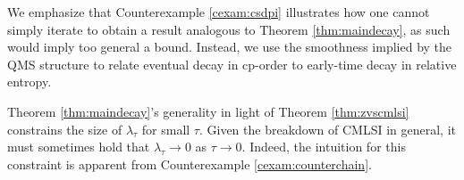 \documentclass[accepted=2026-02-01, letterpaper]{quantumarticle}
\begin{document}
We emphasize that Counterexample \ref{cexam:csdpi} illustrates how one cannot simply iterate \cite[Theorem 2.6]{gao_complete_2025} to obtain a result analogous to Theorem \ref{thm:maindecay}, as such would imply too general a bound. Instead, we use the smoothness implied by the QMS structure to relate eventual decay in cp-order to early-time decay in relative entropy.

Theorem \ref{thm:maindecay}'s generality in light of Theorem \ref{thm:zvscmlsi} constrains the size of $\lambda_\tau$ for small $\tau$. Given the breakdown of CMLSI in general, it must sometimes hold that $\lambda_\tau \rightarrow 0$ as $\tau \rightarrow 0$. Indeed, the intuition for this constraint is apparent from Counterexample \ref{cexam:counterchain}.
\end{document}
